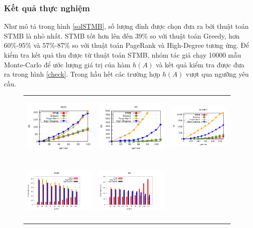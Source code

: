 \subsubsection{Kết quả thực nghiệm} 
Như mô tả trong hình \ref{solSTMB}, số lượng đỉnh được chọn đưa ra bởi thuật toán STMB là nhỏ nhất. STMB tốt hơn lên đến 39\% so với thuật toán Greedy, hơn 60\%-95\% và 57\%-87\% so với thuật toán PageRank và High-Degree tương ứng. Để kiểm tra kết quả thu được từ thuật toán STMB, nhóm tác giả chạy 10000 mẫu Monte-Carlo để ước lượng giá trị của hàm $h(A)$ và kết quả kiểm tra được đưa ra trong hình \ref{check}. Trong hầu hết các trường hợp $h(A)$ vượt qua ngưỡng yêu cầu.
\begin{figure}[H]
\begin{tabular}{lll}
	\includegraphics[height = 3.2cm]{picture/NetS} &
	\includegraphics[height = 3.2cm]{picture/AS} &   
	\includegraphics[height = 3.2cm]{picture/NetHEPT}
	\\
	\includegraphics[height = 3.2cm]{picture/TimeNetS} &
	\includegraphics[height = 3.2cm]{picture/TimeAS} &   

\end{tabular}
\end{figure}
